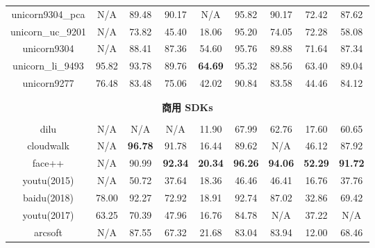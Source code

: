 \documentclass[a4paper, 11pt, UTF8]{ctexart}%
\begin{document}
\begin{table}[h]
\begin{center}
\begin{tabular}{ccccccccc}
unicorn9304\_pca &  N/A & 89.48 & 90.17 & N/A & 95.82 & 90.17 & 72.42 & 87.62\\
\rowcolor{t_gary}
unicorn\_uc\_9201 &  N/A & 73.82 & 45.40 & 18.06 & 95.20 & 74.05 & 72.28 & 58.08 \\
unicorn9304 &  N/A & 88.41 & 87.36 & 54.60 & 95.76 & 89.88 & 71.64 & 87.34\\
\rowcolor{t_gary}
unicorn\_li\_9493 &  95.82 & 93.78 & 89.76 & {\color{red} \bf 64.69} & 95.32 & 88.56 & 63.40 & 89.04 \\
unicorn9277 &  76.48 & 83.48 & 75.06 & 42.02 & 90.84 & 83.58 & 44.46 & 84.12 \\
\\ \hline \\
\multicolumn{9}{c}{\bf 商用 SDKs}\\
\\
\rowcolor{t_gary}
dilu &  N/A & N/A & N/A & 11.90 & 67.99 & 62.76 & 17.60 & 60.65 \\
cloudwalk &  N/A & {\color{orange} \bf 96.78} & 91.78 & 16.44 & 89.62 & N/A & 46.12 & 87.92 \\
\rowcolor{t_gary}
face++ &  N/A & 90.99 & {\color{blue} \bf 92.34} & {\color{blue} \bf 20.34} & {\color{blue} \bf 96.26} & {\color{blue} \bf 94.06} & {\color{blue} \bf 52.29} & {\color{blue} \bf 91.72} \\
youtu(2015) &  N/A & 50.72 & 37.64 & 18.36 & 46.46 & 46.41 & 16.76 & 37.76 \\
\rowcolor{t_gary}
baidu(2018) &  78.00 & 92.27 & 72.92 & 18.91 & 92.74 & 87.02 & 32.86 & 69.42 \\
youtu(2017) &  63.25 & 70.39 & 47.96 & 16.76 & 84.78 & N/A & 37.22 & N/A \\
\rowcolor{t_gary}
arcsoft &  N/A & 87.55 & 67.32 & 21.68 & 83.04 & 83.94 & 12.00 & 68.46 \\
\end{tabular}
\end{center}
\end{table}
\end{document}
